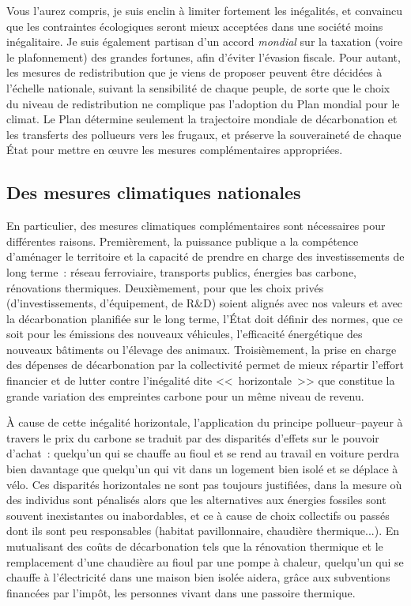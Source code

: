 \documentclass[a5paper,french,openany]{memoir}
\begin{document}
Vous l'aurez compris, je suis enclin à limiter fortement les inégalités, et convaincu que les contraintes écologiques seront mieux acceptées dans une société moins inégalitaire. Je suis également partisan d'un accord \textit{mondial} sur la taxation (voire le plafonnement) des grandes fortunes, afin d'éviter l'évasion fiscale. Pour autant, les mesures de redistribution que je viens de proposer peuvent être décidées à l'échelle nationale, suivant la sensibilité de chaque peuple, de sorte que le choix du niveau de redistribution ne complique pas l'adoption du Plan mondial pour le climat. Le Plan détermine seulement la trajectoire mondiale de décarbonation et les transferts des pollueurs vers les frugaux, et préserve la souveraineté de chaque État pour mettre en œuvre les mesures complémentaires appropriées.

\subsection{Des mesures climatiques nationales} %

En particulier, des mesures climatiques complémentaires sont nécessaires pour différentes raisons. Premièrement, la puissance publique a la compétence d'aménager le territoire et la capacité de prendre en charge des investissements de long terme~: réseau ferroviaire, transports publics, énergies bas carbone, rénovations thermiques. Deuxièmement, pour que les choix privés (d'investissements, d'équipement, de R\&D) soient alignés avec nos valeurs et avec la décarbonation planifiée sur le long terme, l'État doit définir des normes, que ce soit pour les émissions des nouveaux véhicules, l'efficacité énergétique des nouveaux bâtiments ou l'élevage des animaux. %
Troisièmement, la prise en charge des dépenses de décarbonation par la collectivité permet de mieux répartir l'effort financier et de lutter contre l'inégalité dite <<~horizontale~>> que constitue la grande variation des empreintes carbone pour un même niveau de revenu. %

À cause de cette inégalité horizontale, l'application du principe pollueur--payeur à travers le prix du carbone se traduit par des disparités d'effets sur le pouvoir d'achat~: quelqu'un qui se chauffe au fioul et se rend au travail en voiture perdra bien davantage que quelqu'un qui vit dans un logement bien isolé et se déplace à vélo. 
Ces disparités horizontales ne sont pas toujours justifiées, dans la mesure où des individus sont pénalisés alors que les alternatives aux énergies fossiles sont souvent inexistantes ou inabordables, et ce à cause de choix collectifs ou passés dont ils sont peu responsables (habitat pavillonnaire, chaudière thermique...). En mutualisant des coûts de décarbonation tels que la rénovation thermique et le remplacement d'une chaudière au fioul par une pompe à chaleur, quelqu'un qui se chauffe à l'électricité dans une maison bien isolée aidera, grâce aux subventions financées par l'impôt, les personnes vivant dans une passoire thermique. 
\end{document}
